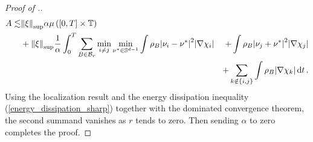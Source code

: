 \begin{proof}[Proof of .]
\begin{alignat*}{2}
		A 
		\lesssim &
		\norm{ \xi }_{ \mathrm{sup} }
		\alpha
		\mu \left(
			[ 0 , T ] \times \operatorname{\mathbb{T}}
		\right)
		\\
		& +
		\norm{ \xi }_{ \mathrm{sup} }
		\frac{ 1 }{ \alpha }
		\int_{ 0 }^{ T }
			\sum_{ B \in \mathcal{ B }_{ r } }
				\min_{ i \neq j }
					\min_{ \nu^{ \ast } \in \mathbb{ S }^{ d - 1 } }
						\int
							\rho_{ B }
							\abs{ \nu_{ i } - \nu^{ \ast } }^{ 2 }
						\abs{ \nabla \chi_{ i } }
						& +
						\int
							\rho_{ B }
							\abs{ \nu_{ j } + \nu^{ \ast } }^{ 2 }
						\abs{ \nabla \chi_{ j } }
		\\
						& &+
						\sum_{ k \notin \{ i , j \} }
							\int
								\rho_{ B }
								\abs{ \nabla \chi_{ k } }
		\dd{ t }.
	\end{alignat*}
	Using the localization result  and 
	the 
	energy dissipation inequality (\ref{energy_dissipation_sharp}) together 
	with the dominated convergence theorem, the second summand vanishes as $ r 
	$ tends to zero. Then sending $ \alpha $ to zero completes the proof.
\end{proof}

